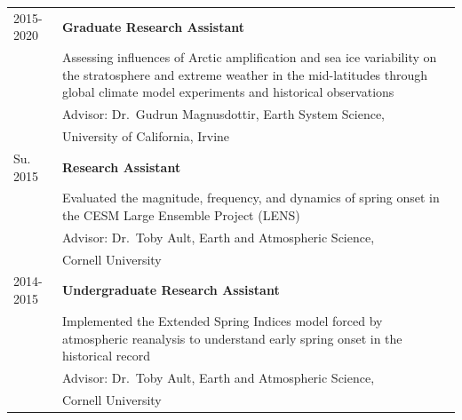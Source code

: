 \documentclass[margin,line,palatino,courier,10pt]{res}
\begin{document}
\begin{resume}
\begin{tabular}{@{}p{0.9in}p{4in}}
2015-2020 & \textbf{Graduate Research Assistant}\\
& Assessing influences of Arctic amplification and sea ice variability on the stratosphere and extreme weather in the mid-latitudes through global climate model experiments and historical observations\\
& \hspace{0.2in} Advisor: Dr.\ Gudrun Magnusdottir, Earth System Science,\\
& \vspace{-0.18in}\hspace{0.2in} University of California, Irvine\\

Su. 2015 & \textbf{Research Assistant}\\
& Evaluated the magnitude, frequency, and dynamics of spring onset in the CESM Large Ensemble Project (LENS) \\
& \hspace{0.2in} Advisor: Dr.\ Toby Ault, Earth and Atmospheric Science,\\
& \vspace{-0.18in}\hspace{0.2in} Cornell University\\

2014-2015 & \textbf{Undergraduate Research Assistant}\\
& Implemented the Extended Spring Indices model forced by atmospheric reanalysis to understand early spring onset in the historical record\\
& \hspace{0.2in} Advisor: Dr.\ Toby Ault, Earth and Atmospheric Science, \\
& \vspace{-0.18in}\hspace{0.2in} Cornell University\\
\end{tabular}

\vspace{-0.1in}
\noindent\textcolor{Cerulean}{\makebox[\linewidth][r]{\rule{\textwidth}{5pt}}}
\vspace{-0.3in}


\end{resume}
\end{document}
